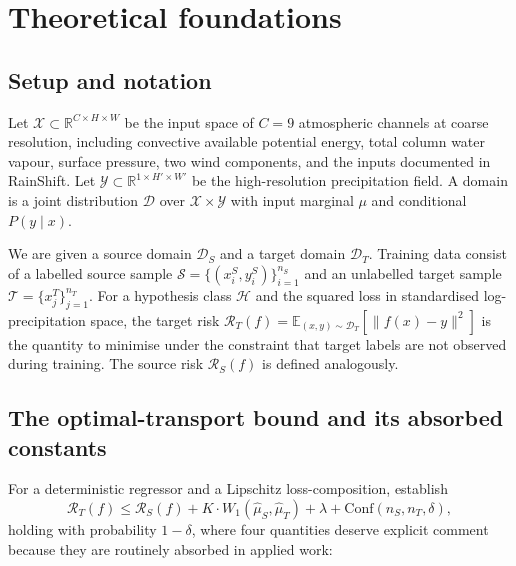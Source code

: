\documentclass{article}
\begin{document}
\section{Theoretical foundations}\label{sec:theory}

\subsection{Setup and notation}

Let $\mathcal{X}\subset\mathbb{R}^{C\times H\times W}$ be the input
space of $C=9$ atmospheric channels at coarse resolution, including
convective available potential energy, total column water vapour,
surface pressure, two wind components, and the inputs documented in
RainShift. Let $\mathcal{Y}\subset\mathbb{R}^{1\times H'\times W'}$ be
the high-resolution precipitation field. A domain is a joint
distribution $\mathcal{D}$ over $\mathcal{X}\times\mathcal{Y}$ with
input marginal $\mu$ and conditional $P(y\mid x)$.

We are given a source domain $\mathcal{D}_S$ and a target domain
$\mathcal{D}_T$. Training data consist of a labelled source sample
$\mathcal{S}=\{(x_i^S,y_i^S)\}_{i=1}^{n_S}$ and an unlabelled target
sample $\mathcal{T}=\{x_j^T\}_{j=1}^{n_T}$. For a hypothesis class
$\mathcal{H}$ and the squared loss in standardised log-precipitation
space, the target risk
$\mathcal{R}_T(f)=\mathbb{E}_{(x,y)\sim\mathcal{D}_T}\!\left[\|f(x)-y\|^2\right]$
is the quantity to minimise under the constraint that target labels
are not observed during training. The source risk $\mathcal{R}_S(f)$
is defined analogously.

\subsection{The optimal-transport bound and its absorbed constants}
\label{sec:redko}

For a deterministic regressor and a Lipschitz loss-composition,
\citet{redko2017theoretical} establish
\begin{equation}
\mathcal{R}_T(f) \le \mathcal{R}_S(f) + K \cdot W_1(\hat\mu_S, \hat\mu_T)
+ \lambda + \mathrm{Conf}(n_S, n_T, \delta),
\label{eq:redko_full}
\end{equation}
holding with probability $1-\delta$, where four quantities deserve
explicit comment because they are routinely absorbed in applied work:
\end{document}

